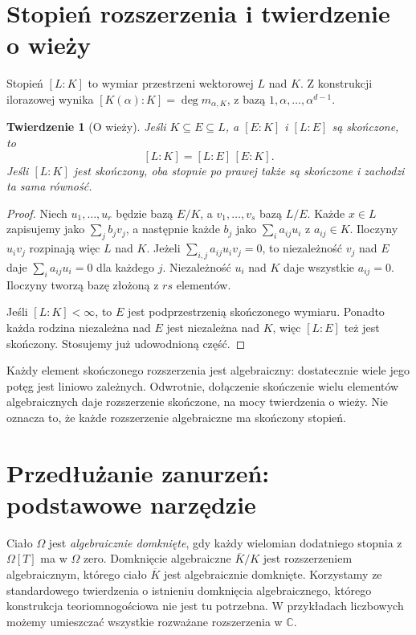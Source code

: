 \documentclass[11pt,a4paper,oneside]{book}
\numberwithin{equation}{section}
\theoremstyle{plain}
\newtheorem{twierdzenie}{Twierdzenie}[chapter]
\theoremstyle{definition}
\theoremstyle{remark}
\newcommand{\C}{\mathbb{C}}
\begin{document}
\section{Stopień rozszerzenia i twierdzenie o wieży}

Stopień $[L:K]$ to wymiar przestrzeni wektorowej $L$ nad $K$. Z konstrukcji ilorazowej wynika $[K(\alpha):K]=\deg m_{\alpha,K}$, z bazą $1,\alpha,\dots,\alpha^{d-1}$.

\begin{twierdzenie}[O wieży]
Jeśli $K\subseteq E\subseteq L$, a $[E:K]$ i $[L:E]$ są skończone, to
\[
[L:K]=[L:E]\,[E:K].
\]
Jeśli $[L:K]$ jest skończony, oba stopnie po prawej także są skończone i zachodzi ta sama równość.
\end{twierdzenie}
\begin{proof}
Niech $u_1,\dots,u_r$ będzie bazą $E/K$, a $v_1,\dots,v_s$ bazą $L/E$. Każde $x\in L$ zapisujemy jako $\sum_j b_jv_j$, a następnie każde $b_j$ jako $\sum_i a_{ij}u_i$ z $a_{ij}\in K$. Iloczyny $u_iv_j$ rozpinają więc $L$ nad $K$. Jeżeli $\sum_{i,j}a_{ij}u_iv_j=0$, to niezależność $v_j$ nad $E$ daje $\sum_i a_{ij}u_i=0$ dla każdego $j$. Niezależność $u_i$ nad $K$ daje wszystkie $a_{ij}=0$. Iloczyny tworzą bazę złożoną z $rs$ elementów.

Jeśli $[L:K]<\infty$, to $E$ jest podprzestrzenią skończonego wymiaru. Ponadto każda rodzina niezależna nad $E$ jest niezależna nad $K$, więc $[L:E]$ też jest skończony. Stosujemy już udowodnioną część.
\end{proof}

Każdy element skończonego rozszerzenia jest algebraiczny: dostatecznie wiele jego potęg jest liniowo zależnych. Odwrotnie, dołączenie skończenie wielu elementów algebraicznych daje rozszerzenie skończone, na mocy twierdzenia o wieży. Nie oznacza to, że każde rozszerzenie algebraiczne ma skończony stopień.

\section{Przedłużanie zanurzeń: podstawowe narzędzie}

Ciało $\Omega$ jest \emph{algebraicznie domknięte}, gdy każdy wielomian dodatniego stopnia z $\Omega[T]$ ma w $\Omega$ zero. Domknięcie algebraiczne $\overline K/K$ jest rozszerzeniem algebraicznym, którego ciało $\overline K$ jest algebraicznie domknięte. Korzystamy ze standardowego twierdzenia o istnieniu domknięcia algebraicznego, którego konstrukcja teoriomnogościowa nie jest tu potrzebna. W przykładach liczbowych możemy umieszczać wszystkie rozważane rozszerzenia w $\C$.
\end{document}
